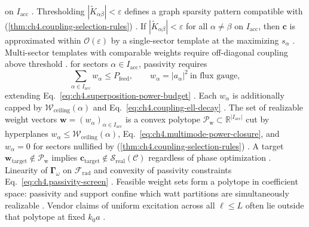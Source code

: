 on \(I_{\mathrm{acc}}\) \cite{harrington2001}. Thresholding \(|\widetilde{K}_{\alpha\beta}|<\varepsilon\) defines a graph sparsity
pattern compatible with (\ref{thm:ch4.coupling-selection-rules}) \cite{hansen1988}.
\label{cor:ch4.diagonal-dominance-rank}
If \(|\widetilde{K}_{\alpha\beta}|<\varepsilon\) for all \(\alpha\neq\beta\) on \(I_{\mathrm{acc}}\), then
\(\mathbf{c}\) is approximated within \(\mathcal{O}(\varepsilon)\) by a single-sector template at the maximizing
\(s_{\alpha}\) \cite{harrington2001}. Multi-sector templates with comparable weights require
off-diagonal coupling above threshold \cite{hansen1988}.
for sectors \(\alpha\in I_{\mathrm{acc}}\), passivity requires
\begin{equation}
\label{eq:ch4.multimode-power-closure}
\sum_{\alpha\in I_{\mathrm{acc}}}
w_{\alpha}
\le
P_{\mathrm{feed}},
\qquad
w_{\alpha}
=
|a_{\alpha}|^{2}
\ \text{in flux gauge},
\end{equation}
extending Eq.~\eqref{eq:ch4.superposition-power-budget} \cite{stratton1941}. Each
\(w_{\alpha}\) is additionally capped by \(\mathcal{W}_{\mathrm{ceiling}}(\alpha)\) and
Eq.~\eqref{eq:ch4.coupling-ell-decay} \cite{hansen1988}.
\label{thm:ch4.feasible-weight-polytope}
The set of realizable weight vectors \(\mathbf{w}=(w_{\alpha})_{\alpha\in I_{\mathrm{acc}}}\) is a convex polytope
\(\mathcal{P}_{\mathrm{w}}\subset\mathbb{R}^{|I_{\mathrm{acc}}|}\) cut by hyperplanes
\(w_{\alpha}\le\mathcal{W}_{\mathrm{ceiling}}(\alpha)\), Eq.~\eqref{eq:ch4.multimode-power-closure}, and
\(w_{\alpha}=0\) for sectors nullified by (\ref{thm:ch4.coupling-selection-rules})
\cite{stratton1941}. A target \(\mathbf{w}_{\mathrm{target}}\notin\mathcal{P}_{\mathrm{w}}\)
implies \(\mathbf{c}_{\mathrm{target}}\notin\mathcal{S}_{\mathrm{real}}(\mathcal{C})\) regardless of phase optimization
\cite{hansen1988}.
Linearity of \(\boldsymbol{\Gamma}_\omega\) on \(\mathcal{F}_{\mathrm{rad}}\) and convexity of passivity constraints
Eq.~\eqref{eq:ch4.passivity-screen} \cite{stratton1941}.
Feasible weight sets form a polytope in coefficient space: passivity and support confine which watt partitions are simultaneously realizable \cite{harrington2001}. Vendor claims of uniform excitation across all $\ell\le L$ often lie outside that polytope at fixed $k_0 a$ \cite{stratton1941}.

